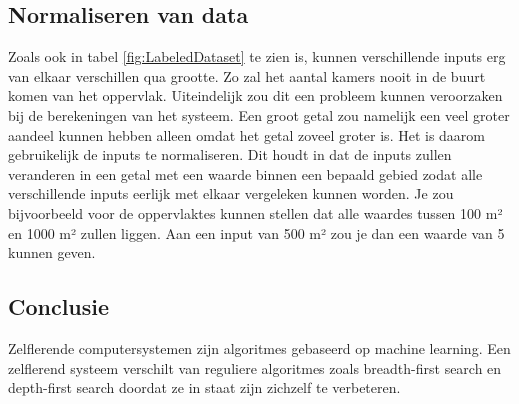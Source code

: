 \subsection{Normaliseren van data}
Zoals ook in tabel \ref{fig:LabeledDataset} te zien is, kunnen verschillende inputs erg van elkaar verschillen qua grootte. Zo zal het aantal kamers nooit in de buurt komen van het oppervlak. Uiteindelijk zou dit een probleem kunnen veroorzaken bij de berekeningen van het systeem. Een groot getal zou namelijk een veel groter aandeel kunnen hebben alleen omdat het getal zoveel groter is. Het is daarom gebruikelijk de inputs te normaliseren. Dit houdt in dat de inputs zullen veranderen in een getal met een waarde binnen een bepaald gebied zodat alle verschillende inputs eerlijk met elkaar vergeleken kunnen worden. Je zou bijvoorbeeld voor de oppervlaktes kunnen stellen dat alle waardes tussen 100 m² en 1000 m² zullen liggen. Aan een input van 500 m² zou je dan een waarde van 5 kunnen geven.

\subsection{Conclusie}
Zelflerende computersystemen zijn algoritmes gebaseerd op machine learning. Een zelflerend systeem verschilt van reguliere algoritmes zoals breadth-first search en depth-first search doordat ze in staat zijn zichzelf te verbeteren.

